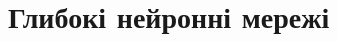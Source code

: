 \documentclass[14pt,a4paper]{extarticle}
\newcounter{e}
\newcommand{\n}{\refstepcounter{e} (\arabic{e})}
\newcounter{pic}
\newcommand{\pic}[1]{\refstepcounter{pic} \vspace{-0.3cm}\textit{Рисунок \arabic{pic}\label{#1}.}}
\numberwithin{equation}{section}
\numberwithin{figure}{section}
\begin{document}
 
 
 \newpage
 \thispagestyle{empty}
 \section{Глибокі нейронні мережі}
 

\end{document}
